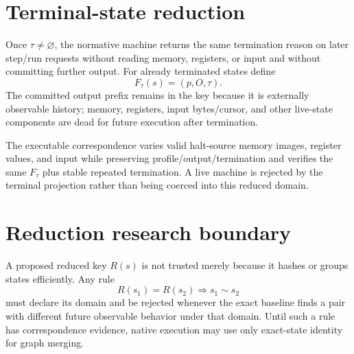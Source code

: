 \documentclass{article}
\begin{document}
\section{Terminal-state reduction}

Once $\tau\neq\varnothing$, the normative machine returns the same termination
reason on later step/run requests without reading memory, registers, or input and
without committing further output. For already terminated states define
\begin{equation}
  F_{\tau}(s)=\left(p,O,\tau\right).
  \label{eq:state-graph-terminal-state}
\end{equation}
The committed output prefix remains in the key because it is externally
observable history; memory, registers, input bytes/cursor, and other live-state
components are dead for future execution after termination.

The executable correspondence varies valid halt-source memory images, register
values, and input while preserving profile/output/termination and verifies the
same $F_{\tau}$ plus stable repeated termination. A live machine is rejected by
the terminal projection rather than being coerced into this reduced domain.

\section{Reduction research boundary}

A proposed reduced key $R(s)$ is not trusted merely because it hashes or groups
states efficiently. Any rule
\[
  R(s_1)=R(s_2)\Longrightarrow s_1\sim s_2
\]
must declare its domain and be rejected whenever the exact baseline finds a pair
with different future observable behavior under that domain. Until such a rule
has correspondence evidence, native execution may use only exact-state identity
for graph merging.
\end{document}
